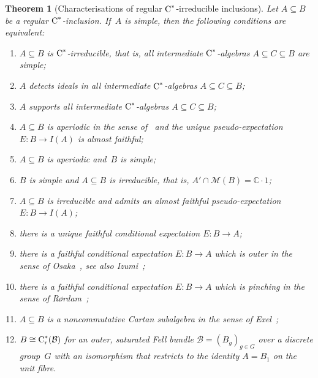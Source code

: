 \documentclass[a4paper]{amsart}
\theoremstyle{plain}
\newtheorem{thmx}{Theorem}
\theoremstyle{definition}
\theoremstyle{remark}
\numberwithin{theorem}{section}
\numberwithin{equation}{section}
\newcommand*{\nb}{\nobreakdash}
\newcommand*{\C}{\mathbb C}
\newcommand*{\red}{\mathrm{r}}%
\newcommand*{\Cst}{\textup C^*}%
\newcommand*{\Mult}{\mathcal M}%
\newcommand*{\B}{\mathcal B}%
\begin{document}
\begin{thmx}[Characterisations of regular \(\Cst\)\nb-irreducible inclusions]
  \label{thm:main_theorem}
  Let \(A\subseteq B\) be a regular \(\Cst\)\nb-inclusion.
  If~\(A\) is simple, then the following conditions are equivalent:
  \begin{enumerate}
  \item \label{enu:main1}%
    \(A\subseteq B\) is \(\Cst\)\nb-irreducible, that is, all
    intermediate \(\Cst\)\nb-algebras \(A\subseteq C\subseteq B\) are
    simple;
  \item \label{enu:main2}%
    \(A\) detects ideals in all intermediate \(\Cst\)\nb-algebras
    \(A\subseteq C \subseteq B\);
  \item \label{enu:main3}%
    \(A\) supports all intermediate \(\Cst\)\nb-algebras \(A\subseteq
    C \subseteq B\);
  \item \label{enu:main4}%
    \(A\subseteq B\) is aperiodic in the sense
    of\/~\cite{Kwasniewski-Meyer:Essential} and the unique
    pseudo-expectation \(E\colon B\to I(A)\) is almost faithful;
  \item \label{enu:main4.5}%
    \(A\subseteq B\) is aperiodic and~\(B\) is simple;
  \item \label{enu:main8}%
    \(B\) is simple and \(A\subseteq B\) is irreducible, that is, \(A'
    \cap \Mult(B) = \C\cdot 1\);
  \item \label{enu:main8.5}%
    \(A\subseteq B\) is irreducible and admits an almost faithful
    pseudo-expectation \(E\colon B\to I(A)\);
  \item \label{enu:main5}%
    there is a unique faithful conditional expectation \(E\colon B\to A\);
  \item \label{enu:main6}%
    there is a faithful conditional expectation \(E\colon B\to A\)
    which is outer in the sense of Osaka~\cite{Osaka:SP_property}, see
    also Izumi~\cite{Izumi:Inclusions_simple};
  \item \label{enu:main7}%
    there is a faithful conditional expectation \(E\colon
    B\to A\) which is  pinching in the sense of
    Rørdam~\cite{Rordam:Irreducible_inclusions};
  \item \label{enu:main9}%
    \(A\subseteq B\) is a noncommutative Cartan subalgebra in the
    sense of Exel~\cite{Exel:noncomm.cartan};
  \item \label{enu:main10}%
    \(B\cong \Cst_\red(\B)\) for an outer, saturated Fell bundle
    \(\B=(B_g)_{g\in G}\) over a discrete group~\(G\) with an
    isomorphism that restricts to the identity \(A=B_1\) on the unit fibre.

\end{enumerate}
\end{thmx}
\end{document}
